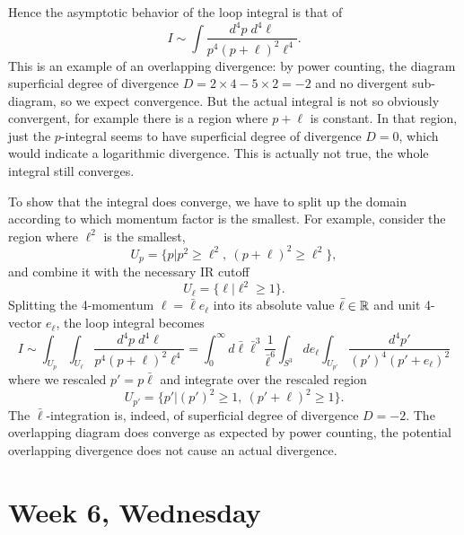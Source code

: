 Hence the asymptotic behavior of the loop integral is that of 
\begin{equation}
  I \sim
  \int \frac{d^4p \; d^4\ell}{p^4 (p+\ell)^2 \ell^4}.
\end{equation}
This is an example of an overlapping divergence: by power counting,
the diagram superficial degree of divergence $D=2\times 4-5\times 2
=-2$ and no divergent sub-diagram, so we expect convergence. But the
actual integral is not so obviously convergent, for example there is a
region where $p+\ell$ is constant. In that region, just the
$p$-integral seems to have superficial degree of divergence $D=0$,
which would indicate a logarithmic divergence. This is actually not
true, the whole integral still converges.

To show that the integral does converge, we have to split up the
domain according to which momentum factor is the smallest. For
example, consider the region where $\ell^2$ is the smallest,
\begin{equation}
  U_p = \big\{
  p \big|
  p^2 \geq \ell^2,~ (p+\ell)^2 \geq \ell^2  \big\},
\end{equation}
and combine it with the necessary IR cutoff
\begin{equation}
  U_\ell = \big\{
  \ell \big| \ell^2 \geq 1 \big\}.
\end{equation}
Splitting the 4-momentum $\ell = \bar\ell e_\ell$ into its absolute
value $\bar\ell\in{\mathbb{R}}$ and unit 4-vector $e_\ell$, the loop integral
becomes
\begin{equation}
  I \sim
  \int_{U_p} \int_{U_\ell}
  \frac{d^4p \; d^4\ell}{p^4 (p+\ell)^2 \ell^4}
  = 
  \int_0^\infty d\bar\ell
  \bar\ell^3
  \frac{1}{\bar\ell^6}
  \int_{S^3} de_\ell 
  \int_{U_{p'}}
  \frac{d^4 p'}{(p')^4 (p'+e_\ell)^2}
\end{equation}
where we rescaled $p' = p \bar\ell$ and integrate over the  rescaled
region
\begin{equation}
  U_{p'} = \big\{
  p' \big|
  (p')^2 \geq 1,~ (p'+\ell)^2 \geq 1  \big\}.
\end{equation}
The $\bar\ell$-integration is, indeed, of superficial degree of
divergence $D=-2$. The overlapping diagram does converge as expected
by power counting, the potential overlapping divergence does not cause
an actual divergence.



\section{Week 6, Wednesday}


